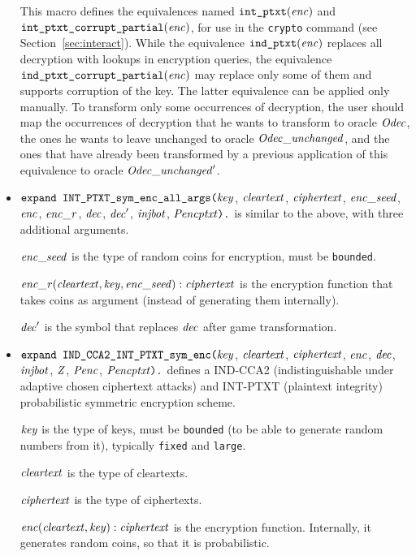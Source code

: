 \documentclass{article}
\begin{document}
\begin{itemize}
   This macro defines the equivalences named
   $\texttt{int\_ptxt}(\mathit{enc})$ and
   $\texttt{int\_ptxt\_corrupt\_partial}(\mathit{enc})$, for use in the
   \texttt{crypto} command (see Section~\ref{sec:interact}).  While
   the equivalence $\texttt{ind\_ptxt}(\mathit{enc})$ replaces all
   decryption with lookups in encryption queries, the equivalence
   $\texttt{ind\_ptxt\_corrupt\_partial}(\mathit{enc})$ may replace only some of them
   and supports corruption of the key. 
   The latter equivalence can be applied only manually.
   To transform only some occurrences of decryption, 
   the user should map the occurrences of decryption that he wants to
   transform to oracle $\mathit{Odec}$, the ones he wants to leave
   unchanged to oracle $\mathit{Odec\_unchanged}$, and the ones that have
   already been transformed by a previous application of this
   equivalence to oracle $\mathit{Odec\_unchanged}'$.

\item $\texttt{expand INT\_PTXT\_sym\_enc\_all\_args(}\mathit{key}$,
$  \mathit{cleartext}$, $\mathit{ciphertext}$, $\mathit{enc\_seed}$, $\mathit{enc}$, $\mathit{enc\_r}$,
$  \mathit{dec}$, $\mathit{dec}'$, $\mathit{injbot}$, $\mathit{Pencptxt}\texttt{).}$ is similar to the above,
  with three additional arguments. 

  $\mathit{enc\_seed}$ is the type of random coins for encryption, must be \texttt{bounded}.

  $\mathit{enc\_r}(\mathit{cleartext}, \mathit{key}, \mathit{enc\_seed}): \mathit{ciphertext}$ is the encryption function that takes coins as argument (instead of generating them internally).

  $\mathit{dec}'$ is the symbol that replaces $\mathit{dec}$ after game transformation.

\item $\texttt{expand IND\_CCA2\_INT\_PTXT\_sym\_enc(}\mathit{key}$,
$  \mathit{cleartext}$, $\mathit{ciphertext}$, $\mathit{enc}$,
$  \mathit{dec}$, $\mathit{injbot}$, $\mathit{Z}$, $\mathit{Penc}$, $\mathit{Pencptxt}\texttt{).}$ defines a
  IND-CCA2 (indistinguishable under adaptive chosen ciphertext attacks) and INT-PTXT (plaintext integrity)
  probabilistic symmetric encryption scheme.

   $\mathit{key}$ is the type of keys, must be \texttt{bounded} (to be able to generate random numbers from it), typically \texttt{fixed} and \texttt{large}.

   $\mathit{cleartext}$ is the type of cleartexts.

   $\mathit{ciphertext}$ is the type of ciphertexts.

   $\mathit{enc}(\mathit{cleartext}, \mathit{key}): \mathit{ciphertext}$ is the encryption function. Internally, it generates random coins, so that it is probabilistic.


\end{itemize}
\end{document}

